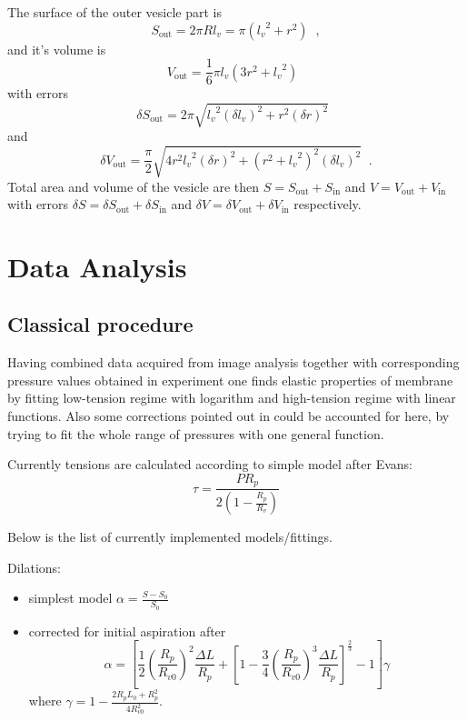 The surface of the outer vesicle part is
\begin{equation*}
S_\text{out} = 2\pi Rl_v = \pi \left({l_v}^2+r^2\right)\;\;,
\end{equation*}
and it's volume is
\begin{equation*}
V_\text{out} = \frac{1}{6}\pi l_v\left(3r^2+{l_v}^2\right)\;\;
\end{equation*}
with errors
\begin{equation*}
\delta S_\text{out} = 2\pi\sqrt{{l_v}^2 \left(\delta l_v\right)^2 + r^2 \left( \delta r\right) ^2}\;\;
\end{equation*}
and
\begin{equation*}
\delta V_\text{out} = \frac{\pi}{2} \sqrt{4 r^2 {l_v}^2\left(\delta r\right)^2 + \left(r^2+{l_v}^2\right)^2 \left(\delta l_v\right)^2}\;\;.
\end{equation*}
Total area and volume of the vesicle are then $S = S_\text{out}+S_\text{in}$ and $V = V_\text{out}+V_\text{in}$ with errors $\delta S = \delta S_\text{out} + \delta S_\text{in}$ and $\delta V = \delta V_\text{out} + \delta V_\text{in}$ respectively.

\section{Data Analysis}\label{analysis}
\subsection{Classical procedure}
Having combined data acquired from image analysis together with corresponding pressure values obtained in experiment one finds elastic properties of membrane by fitting low-tension regime with logarithm and high-tension regime with linear functions. Also some corrections pointed out in \cite{Henriksen2004, Fournier2001} could be accounted for here, by trying to fit the whole range of pressures with one general function.

Currently tensions are calculated according to simple model after Evans:
\begin{equation}
\tau = \frac{P R_p}{2\left(1-\frac{R_p}{R_v}\right)}
\label{eq:tau-evans}
\end{equation}

Below is the list of currently implemented models/fittings.

Dilations:
\begin{itemize}
	\item simplest model $\alpha = \frac{S-S_0}{S_0}$
	\item corrected for initial aspiration after \cite{Henriksen2004}
	\begin{equation}
		\alpha = \left[
		 \frac{1}{2} \left(\frac{R_p}{R_{v0}}\right)^2 \frac{\Delta L}{R_p} 
		 + \left[1-\frac{3}{4}\left(\frac{R_p}{R_{v0}}\right)^3 \frac{\Delta L}{R_p} \right]^{\frac{2}{3}}
		 - 1 
		\right]\gamma
		\label{eq:alpha-henriksen}
	\end{equation}
	where $\displaystyle{\gamma = 1-\frac{2R_p L_0+R_p^2}{4R_{v0}^2}}$.
\end{itemize}

